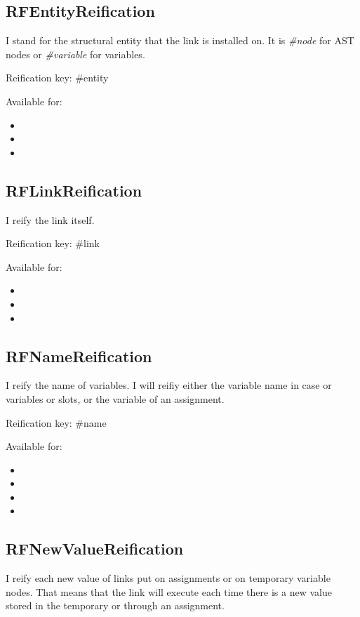 \documentclass[10pt,twoside,english]{_support/latex/sbabook/sbabook}
\begin{document}
\subsection{RFEntityReification}
I stand for the structural entity that the link is installed on. It is \textit{\#node} for AST nodes or \textit{\#variable} for variables.

Reification key: \#entity

Available for:

\begin{itemize}
\item {}
\item {}
\item {}
\end{itemize}
\subsection{RFLinkReification}
I reify the link itself. 

Reification key: \#link

Available for:

\begin{itemize}
\item {}
\item {}
\item {}
\end{itemize}
\subsection{RFNameReification}
I reify the name of variables. I will reifiy either the variable name in case or variables or slots, or the variable of an assignment. 

Reification key: \#name

Available for:

\begin{itemize}
\item {}
\item {}
\item {}
\item {}
\end{itemize}
\subsection{RFNewValueReification}
I reify each new value of links put on assignments or on temporary variable nodes. That means that the link will execute each time there is a new value stored in the temporary or through an assignment.
\end{document}
